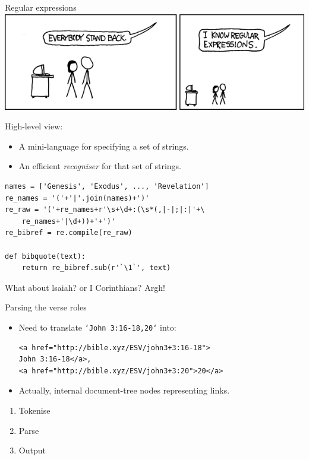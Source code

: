 \documentclass{beamer}
\begin{document}
\begin{frame}{Regular expressions}
    \includegraphics[keepaspectratio=true, width=0.9\paperwidth]{regular_expressions.png}

High-level view:
\begin{itemize}
\item A mini-language for specifying a set of strings.
\item An efficient \emph{recogniser} for that set of strings.
\end{itemize}

\end{frame}



\begin{frame}[fragile]
    
\begin{verbatim}
names = ['Genesis', 'Exodus', ..., 'Revelation']
re_names = '('+'|'.join(names)+')'
re_raw = '('+re_names+r'\s+\d+:(\s*(,|-|;|:|'+\
    re_names+'|\d+))+'+')'
re_bibref = re.compile(re_raw)

def bibquote(text):
    return re_bibref.sub(r'`\1`', text)
\end{verbatim}

What about lsaiah? or I Corinthians? Argh!

\end{frame}

\begin{frame}[fragile]{Parsing the verse roles}
\begin{itemize}
\item Need to translate \texttt{`John 3:16-18,20`} into:

\begin{verbatim}
<a href="http://bible.xyz/ESV/john3+3:16-18">
John 3:16-18</a>,
<a href="http://bible.xyz/ESV/john3+3:20">20</a>
\end{verbatim}

\item Actually, internal document-tree nodes representing links.
\end{itemize}

\begin{enumerate}
\item Tokenise
\item Parse
\item Output
\end{enumerate}
\end{frame}
\end{document}
